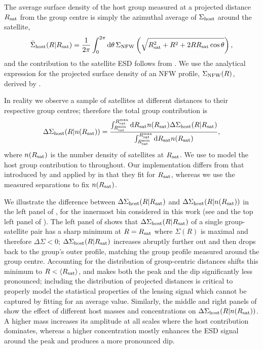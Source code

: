 The average surface density of the host group measured at a projected distance $R_{\rm sat}$ from the 
group centre is simply the azimuthal average of $\Sigma_{\rm host}$ around the satellite,
\begin{equation}\label{eq:NFWdisplaced}
 \bar\Sigma_{\rm host}(R \vert R_{\rm sat}) = \frac1{2\pi}\int_0^{2\pi}{\rm d}\theta\,\Sigma_{\rm 
NFW}\left(\sqrt{R_{\rm sat}^2 + R^2 + 2RR_{\rm sat}\cos\theta}\right),
\end{equation}
and the contribution to the satellite ESD follows from . We use the analytical 
expression for the projected surface density of an NFW profile, $\Sigma_{\rm NFW}(R)$, derived 
by \cite{wright00}.

In reality we observe a sample of satellites at different distances to their respective group 
centres; therefore the total group contribution is
\begin{equation}\label{eq:esd_sum}
 \Delta\Sigma_{\rm host}(R\vert n(R_{\rm sat})) =
     \frac{\int_{R_{\rm sat}^{\rm min}}^{R_{\rm sat}^{\rm max}}{\rm d}
           R_{\rm sat} n(R_{\rm sat})\Delta\Sigma_{\rm host}(R \vert R_{\rm sat})}
          {\int_{R_{\rm sat}^{\rm min}}^{R_{\rm sat}^{\rm max}}{\rm d}
           R_{\rm sat} n(R_{\rm sat})},
\end{equation}
where $n(R_{\rm sat})$ is the number density of satellites at $R_{\rm sat}$. We use  to model 
the host group contribution to  throughout. Our implementation differs 
from that introduced by \cite{yang06} and applied by \cite{li14} in that they fit for $R_{\rm sat}$, 
whereas we use the measured separations to fix $n(R_{\rm sat})$.

We illustrate the difference between $\Delta\Sigma_{\rm host}(R\vert R_{\rm sat})$ and $\Delta\Sigma_{\rm 
host}(R\vert n(R_{\rm sat}))$ in the left panel of , for the innermost 
bin considered in this work (see  and the top left panel of  ). 
The left panel of  shows that $\Delta\Sigma_{\rm host}(R\vert R_{\rm sat})$ 
of a single group-satellite pair has a sharp minimum at $R=R_{\rm sat}$ where $\Sigma(R)$ is maximal and 
therefore $\Delta\Sigma<0$; $\Delta\Sigma_{\rm host}(R\vert R_{\rm sat})$ increases abruptly further out 
and then drops back to the group's outer profile, matching the group profile measured around the 
group centre. Accounting for the distribution of group-centric distances shifts this minimum to 
$R<\langle R_{\rm sat}\rangle$, and makes both the peak and the dip significantly less pronounced; 
including the distribution of projected distances is critical to properly model the statistical 
properties of the lensing signal which cannot be captured by fitting for an average value. 
Similarly, the middle and right panels of  show the effect of different 
host masses and concentrations on $\Delta\Sigma_{\rm host}(R\vert n(R_{\rm sat}))$. A higher mass 
increases its amplitude at all scales where the host contribution dominates, whereas a higher 
concentration mostly enhances the ESD signal around the peak and produces a more pronounced dip.

